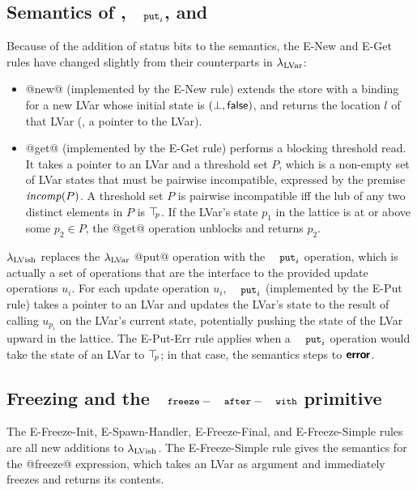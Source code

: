 \FigLambdaLVishReductionSemantics

\FigLambdaLVishContextSemantics

\subsection{Semantics of , $\PUTi$, and }\label{subsection:quasi-semantics-of-new-put-and-get}

Because of the addition of status bits to the semantics, the {\sc
  E-New} and {\sc E-Get} rules have changed slightly from their
counterparts in $\lambda_{\textrm{LVar}}$:

\begin{itemize}
\item @new@ (implemented by the {\sc E-New} rule) extends the store
  with a binding for a new LVar whose initial state is $(\bot,
  \textsf{false})$, and returns the location $l$ of that LVar (\ie, a
  pointer to the LVar).
\item @get@ (implemented by the {\sc E-Get} rule) performs a blocking
  threshold read.  It takes a pointer to an LVar and a threshold
    set $P$, which is a non-empty set of LVar states that must be
  pairwise incompatible, expressed by the premise $\mathit{incomp}(P)$.
  A threshold set $P$ is pairwise incompatible iff the lub of any two
  distinct elements in $P$ is $\top\hspace{-0.85mm}_{p}$.  If the LVar's state $p_1$ in
  the lattice is at or above some $p_2 \in P$, the @get@
  operation unblocks and returns $p_2$.
\end{itemize}

\noindent $\lambda_{\textrm{LVish}}$ replaces the $\lambda_{\textrm{LVar}}$ @put@ operation with the $\PUTi$
operation, which is actually a set of operations that are the interface
to the provided update operations $u_i$.  For each update
operation $u_i$, $\PUTi$ (implemented by the {\sc E-Put} rule) takes a
pointer to an LVar and updates the LVar's state to the result of calling
$u_{p_i}$ on the LVar's current state, potentially pushing the state
of the LVar upward in the lattice.  The {\sc E-Put-Err} rule applies
when a $\PUTi$ operation would take the state of an LVar to $\top\hspace{-0.85mm}_{p}$;
in that case, the semantics steps to $\textbf{\textsf{error}}$.

\subsection{Freezing and the $\FAW$ primitive}\label{subsection:quasi-freezing}

The {\sc E-Freeze-Init}, {\sc E-Spawn-Handler}, {\sc E-Freeze-Final},
and {\sc E-Freeze-Simple} rules are all new additions to
$\lambda_{\textrm{LVish}}$.  The {\sc E-Freeze-Simple} rule gives the semantics
for the @freeze@ expression, which takes an LVar as argument and
immediately freezes and returns its contents.

